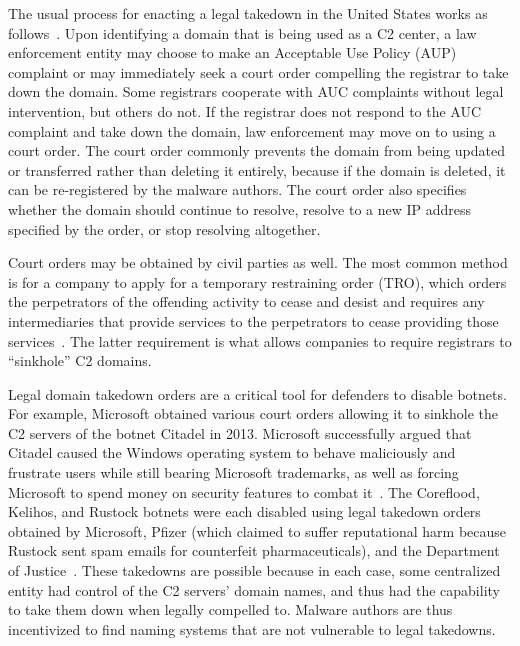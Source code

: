 The usual process for enacting a legal takedown in the United States works as 
follows~\cite{knight_domain_2015}. Upon 
identifying a domain that is being used as a C2 center, a law enforcement 
entity may choose to make 
an Acceptable Use Policy (AUP) complaint or may immediately seek a court order 
compelling the 
registrar to take down the domain. Some registrars cooperate with AUC 
complaints without legal 
intervention, but others do not. If the registrar does not respond to the 
AUC complaint and take 
down the domain, law enforcement may move on to using a court order. The 
court order commonly 
prevents the domain from being updated or transferred rather than deleting it 
entirely, because if 
the domain is deleted, it can be re-registered by the malware authors. The 
court order also 
specifies whether the domain should continue to resolve, resolve to a new IP 
address specified by 
the order, or stop resolving altogether. 

Court orders may be obtained by civil parties as well. The most common method 
is for a company to 
apply for a temporary restraining order (TRO), which orders the perpetrators 
of the offending 
activity to cease and desist and requires any intermediaries that provide 
services to the 
perpetrators to cease providing those services~\cite{kesari_deterring_2017}. 
The latter requirement 
is what allows companies to require registrars to ``sinkhole'' C2 
domains. 

Legal domain takedown orders are a critical tool for defenders to disable 
botnets. For example, 
Microsoft obtained various court orders allowing it to sinkhole the C2 servers 
of the botnet 
Citadel in 2013. Microsoft successfully argued that Citadel caused the Windows 
operating system to 
behave maliciously and frustrate users while still bearing Microsoft 
trademarks, as well as forcing 
Microsoft to spend money on security features to combat 
it~\cite{lerner_microsoft_2014}. The 
Coreflood, Kelihos, and Rustock botnets were each disabled using legal 
takedown orders obtained by 
Microsoft, Pfizer (which claimed to suffer reputational harm because Rustock 
sent spam emails for 
counterfeit pharmaceuticals), and the Department of 
Justice~\cite{kesari_deterring_2017}. These 
takedowns are possible because in each case, some centralized entity had 
control of the C2 servers' 
domain names, and thus had the capability to take them down when legally 
compelled to. Malware 
authors are thus incentivized to find naming systems that are not vulnerable to 
legal takedowns.  

